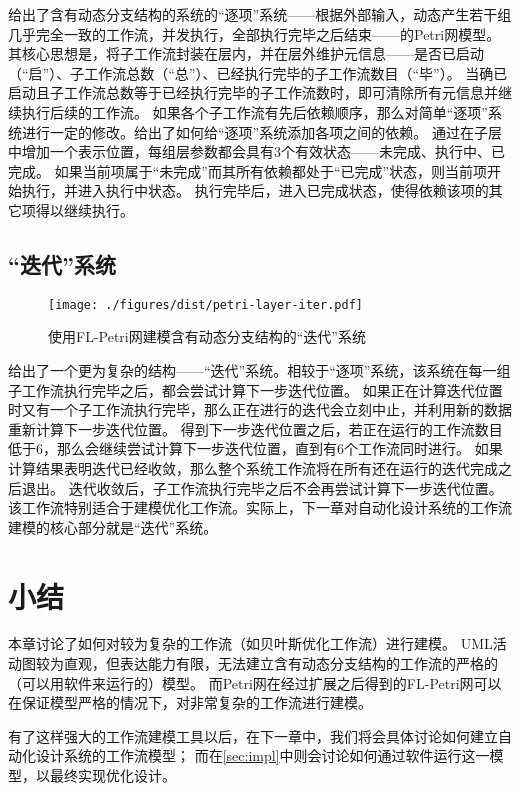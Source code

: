 \documentclass[index]{subfiles}
\begin{document}
给出了含有动态分支结构的系统的“逐项”系统——根据外部输入，动态产生若干组几乎完全一致的工作流，并发执行，全部执行完毕之后结束——的Petri网模型。
其核心思想是，将子工作流封装在层内，并在层外维护元信息——是否已启动（“启”）、子工作流总数（“总”）、已经执行完毕的子工作流数目（“毕”）。
当确已启动且子工作流总数等于已经执行完毕的子工作流数时，即可清除所有元信息并继续执行后续的工作流。
如果各个子工作流有先后依赖顺序，那么对简单“逐项”系统进行一定的修改。给出了如何给“逐项”系统添加各项之间的依赖。
通过在子层中增加一个表示位置，每组层参数都会具有3个有效状态——未完成、执行中、已完成。
如果当前项属于“未完成”而其所有依赖都处于“已完成”状态，则当前项开始执行，并进入执行中状态。
执行完毕后，进入已完成状态，使得依赖该项的其它项得以继续执行。

\subsection{“迭代”系统}
\begin{figure}[h]
  \centering
  \texttt{[image: ./figures/dist/petri-layer-iter.pdf]}
  \caption{使用FL-Petri网建模含有动态分支结构的“迭代”系统\label{fig:petri-layer-iter}}
\end{figure}

给出了一个更为复杂的结构——“迭代”系统。相较于“逐项”系统，该系统在每一组子工作流执行完毕之后，都会尝试计算下一步迭代位置。
如果正在计算迭代位置时又有一个子工作流执行完毕，那么正在进行的迭代会立刻中止，并利用新的数据重新计算下一步迭代位置。
得到下一步迭代位置之后，若正在运行的工作流数目低于6，那么会继续尝试计算下一步迭代位置，直到有6个工作流同时进行。
如果计算结果表明迭代已经收敛，那么整个系统工作流将在所有还在运行的迭代完成之后退出。
迭代收敛后，子工作流执行完毕之后不会再尝试计算下一步迭代位置。
该工作流特别适合于建模优化工作流。实际上，下一章对自动化设计系统的工作流建模的核心部分就是“迭代”系统。

\section{小结}
本章讨论了如何对较为复杂的工作流（如贝叶斯优化工作流）进行建模。
UML活动图较为直观，但表达能力有限，无法建立含有动态分支结构的工作流的严格的（可以用软件来运行的）模型。
而Petri网在经过扩展之后得到的FL-Petri网可以在保证模型严格的情况下，对非常复杂的工作流进行建模。

有了这样强大的工作流建模工具以后，在下一章中，我们将会具体讨论如何建立自动化设计系统的工作流模型；
而在\cref{sec:impl}中则会讨论如何通过软件运行这一模型，以最终实现优化设计。
\end{document}
